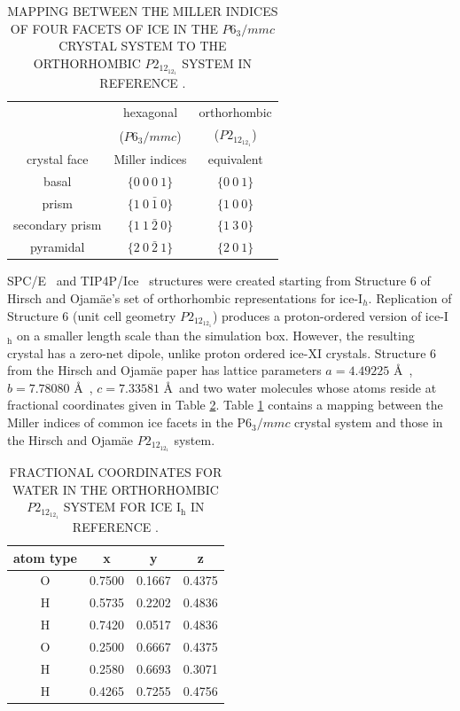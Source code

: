 \begin{table}
\centering
  \caption{MAPPING BETWEEN THE MILLER INDICES OF FOUR FACETS OF ICE IN
    THE $P6_3/mmc$ CRYSTAL SYSTEM TO THE ORTHORHOMBIC $P2_12_12_1$
    SYSTEM IN REFERENCE  \protect\citep{Hirsch04}.}
\label{tab:equiv}
\begin{tabular}{|ccc|} \hline
 & hexagonal & orthorhombic \\
 & ($P6_3/mmc$) & ($P2_12_12_1$) \\
 crystal face  & Miller indices & equivalent \\ \hline
basal & $\{0~0~0~1\}$ & $\{0~0~1\}$ \\
prism & $\{1~0~\bar{1}~0\}$ & $\{1~0~0\}$ \\
secondary prism & $\{1~1~\bar{2}~0\}$ & $\{1~3~0\}$ \\
pyramidal & $\{2~0~\bar{2}~1\}$ & $\{2~0~1\}$ \\ \hline
\end{tabular}
\end{table}

SPC/E~\cite{Berendsen1987} and TIP4P/Ice~\cite{Abascal2005} structures
were created starting from Structure 6 of Hirsch and Ojam\"{a}e's set
of orthorhombic representations for ice-I$_{h}$.\cite{Hirsch2004}
Replication of Structure 6 (unit cell geometry $P2_12_12_1$) produces
a proton-ordered version of ice-I$_\mathrm{h}$ on a smaller length
scale than the simulation box. However, the resulting crystal has a
zero-net dipole, unlike proton ordered ice-XI crystals.  Structure 6
from the Hirsch and Ojam\"{a}e paper has lattice parameters
$a = 4.49225$ \AA\ , $b = 7.78080$ \AA\ , $c = 7.33581$ \AA\ and two
water molecules whose atoms reside at fractional coordinates given in
Table \ref{tab:p212121}.  Table \ref{tab:equiv} contains a mapping
between the Miller indices of common ice facets in the P$6_3/mmc$
crystal system and those in the Hirsch and Ojam\"{a}e $P2_12_12_1$
system.

\begin{table}
\centering
  \caption{FRACTIONAL COORDINATES FOR WATER IN THE ORTHORHOMBIC
    $P2_12_12_1$ SYSTEM FOR ICE I$_\mathrm{h}$ IN REFERENCE  \protect\citep{Hirsch0404}.}
\label{tab:p212121}
\begin{tabular}{|cccc|}  \hline
atom type & x & y & z \\ \hline
 O & 0.7500 & 0.1667 & 0.4375 \\
 H & 0.5735 & 0.2202 & 0.4836 \\
 H & 0.7420 & 0.0517 & 0.4836 \\
 O & 0.2500 & 0.6667 & 0.4375 \\
 H & 0.2580 & 0.6693 & 0.3071 \\
 H & 0.4265 & 0.7255 & 0.4756 \\ \hline
\end{tabular}
\end{table}


